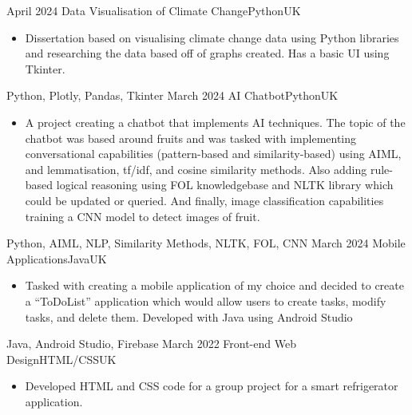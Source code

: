 \begin{experiences}
  \experience
  {April 2024}   {Data Visualisation of Climate Change}{Python}{UK}
  {} {
    \begin{itemize}
      \item Dissertation based on visualising climate change data using Python libraries and researching the data based off of graphs created. Has a basic UI using Tkinter.
    \end{itemize}
  }
  {Python, Plotly, Pandas, Tkinter}
  \emptySeparator
  \experience
  {March 2024}   {AI Chatbot}{Python}{UK}
  {} {
    \begin{itemize}
      \item A project creating a chatbot that implements AI techniques. The topic of the chatbot was based around fruits and was tasked with implementing conversational capabilities (pattern-based and similarity-based) using AIML, and lemmatisation, tf/idf, and cosine similarity methods. Also adding rule-based logical reasoning using FOL knowledgebase and NLTK library which could be updated or queried. And finally, image classification capabilities training a CNN model to detect images of fruit.
    \end{itemize}
  }
  {Python, AIML, NLP, Similarity Methods, NLTK, FOL, CNN}
  \emptySeparator
  \experience
  {March 2024}   {Mobile Applications}{Java}{UK}
  {} {
    \begin{itemize}
      \item Tasked with creating a mobile application of my choice and decided to create a “ToDoList” application which would allow users to create tasks, modify tasks, and delete them. 
      Developed with Java using Android Studio
    \end{itemize}
  }
  {Java, Android Studio, Firebase}
  \emptySeparator
  \experience
  {March 2022}   {Front-end Web Design}{HTML/CSS}{UK}
  {} {
    \begin{itemize}
      \item Developed HTML and CSS code for a group project for a smart refrigerator application.


\end{itemize}}
\end{experiences}
